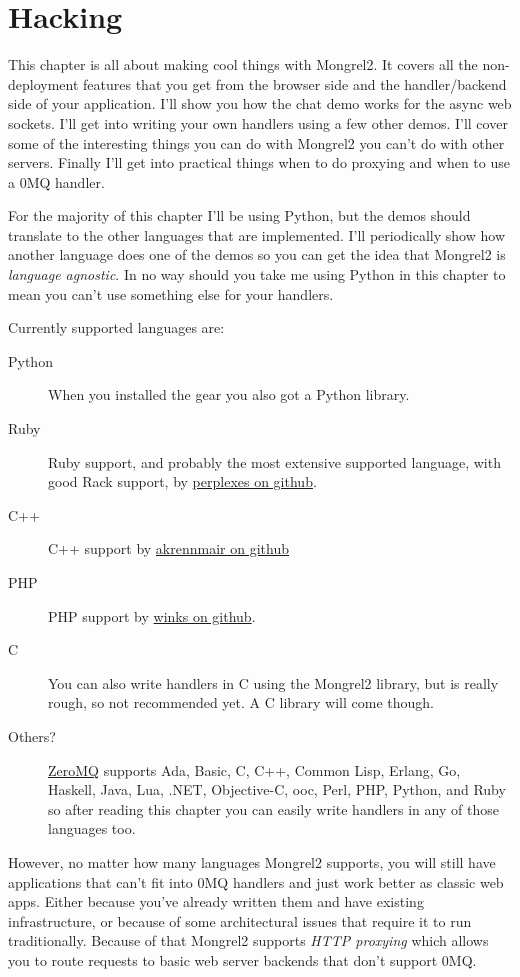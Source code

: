 \chapter{Hacking}

This chapter is all about making cool things with Mongrel2.  It covers all the non-deployment
features that you get from the browser side and the handler/backend side of your application.
I'll show you how the chat demo works for the async web sockets.  I'll get into writing your
own handlers using a few other demos.  I'll cover some of the interesting things you can
do with Mongrel2 you can't do with other servers.  Finally I'll get into practical things
when to do proxying and when to use a 0MQ handler.

For the majority of this chapter I'll be using Python, but the demos should translate to
the other languages that are implemented.  I'll periodically show how another language
does one of the demos so you can get the idea that Mongrel2 is \emph{language agnostic}.
In no way should you take me using Python in this chapter to mean you can't use something
else for your handlers.

Currently supported languages are:

\begin{description}
\item [Python] When you installed the  gear you also got a  Python library.
\item [Ruby] Ruby support, and probably the most extensive supported language, with good Rack support, by \href{http://github.com/perplexes/m2r}{perplexes on github}.
\item [C++] C++ support by \href{http://github.com/akrennmair/mongrel2-cpp}{akrennmair on github}
\item [PHP] PHP support by \href{http://github.com/winks/m2php}{winks on github}.
\item [C] You can also write handlers in C using the Mongrel2 library, but is really rough, so not recommended yet.  A C library will come though.
\item [Others?] \href{http://zeromq.org}{ZeroMQ} supports Ada, Basic, C, C++, Common Lisp, Erlang, Go, Haskell, Java, Lua, .NET, Objective-C, ooc, Perl, PHP, Python, and Ruby so after reading this chapter you can easily write handlers in any of those languages too.
\end{description}

However, no matter how many languages Mongrel2 supports, you will still have applications that
can't fit into 0MQ handlers and just work better as classic web apps.  Either because you've
already written them and have existing infrastructure, or because of some architectural issues
that require it to run traditionally.  Because of that Mongrel2 supports \emph{HTTP proxying}
which allows you to route requests to basic web server backends that don't support 0MQ.

